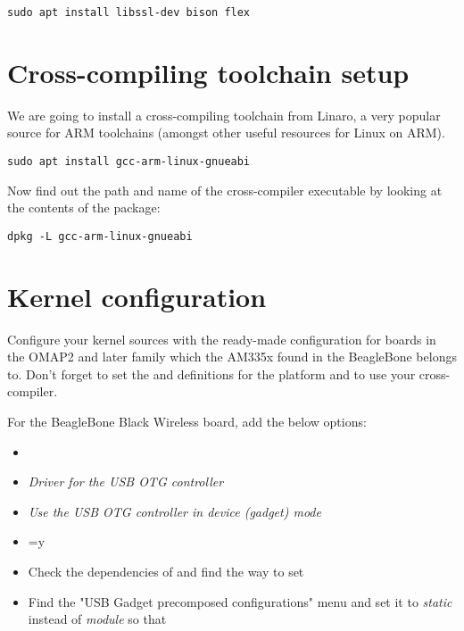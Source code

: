 \begin{verbatim}
sudo apt install libssl-dev bison flex
\end{verbatim}

\section{Cross-compiling toolchain setup}

We are going to install a cross-compiling toolchain from Linaro, a
very popular source for ARM toolchains (amongst other useful resources
for Linux on ARM).

\begin{verbatim}
sudo apt install gcc-arm-linux-gnueabi
\end{verbatim}

Now find out the path and name of the cross-compiler executable by looking at the contents of the package:

\begin{verbatim}
dpkg -L gcc-arm-linux-gnueabi
\end{verbatim}

\section{Kernel configuration}

Configure your kernel sources with the ready-made configuration for boards in
the OMAP2 and later family which the AM335x found in the BeagleBone
belongs to. Don't forget to set the  and
 definitions for the  platform and to
use your cross-compiler.

For the BeagleBone Black Wireless board, add the below options:
\begin{itemize}
  \item {}
  \item {} {\em Driver for the USB OTG
        controller}
  \item {} {\em Use the USB OTG controller
	in device (gadget) mode} 
  \item {}=y
  \item Check the dependencies of 
        and find the way to set 
  \item Find the "USB Gadget precomposed configurations" menu
        and set it to {\em static} instead of {\em module}
	so that 
\end{itemize}

